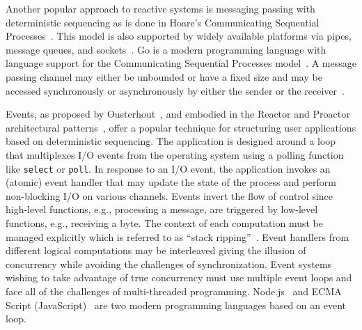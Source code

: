 Another popular approach to reactive systems is messaging passing with deterministic sequencing as is done in Hoare's Communicating Sequential Processes~\cite{hoare1978communicating}.
This model is also supported by widely available platforms via pipes, message queues, and sockets~\cite{silberschatz2005operating}.
Go is a modern programming language with language support for the Communicating Sequential Processes model~\cite{go}.
A message passing channel may either be unbounded or have a fixed size and may be accessed synchronously or asynchronously by either the sender or the receiver~\cite{andrews1983concepts}.


Events, as proposed by Ousterhout~\cite{ousterhout1996threads}, and embodied in the Reactor and Proactor architectural patterns~\cite{schmidt2000pattern}, offer a popular technique for structuring user applications based on deterministic sequencing.
The application is designed around a loop that multiplexes I/O events from the operating system using a polling function like \verb+select+ or \verb+poll+.
In response to an I/O event, the application invokes an (atomic) event handler that may update the state of the process and perform non-blocking I/O on various channels.
Events invert the flow of control since high-level functions, e.g., processing a message, are triggered by low-level functions, e.g., receiving a byte.
The context of each computation must be managed explicitly which is referred to as ``stack ripping''~\cite{adya2002cooperative}.
Event handlers from different logical computations may be interleaved giving the illusion of concurrency while avoiding the challenges of synchronization.
Event systems wishing to take advantage of true concurrency must use multiple event loops and face all of the challenges of multi-threaded programming.
Node.js~\cite{Surhone:2010:NOD:1941165} and ECMA Script (JavaScript)~\cite{EcmaScript} are two modern programming languages based on an event loop.

